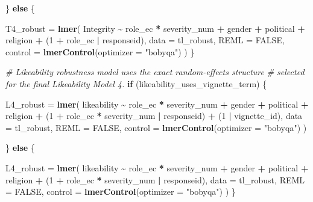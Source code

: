 \documentclass[
]{article}
\newenvironment{Shaded}{\begin{snugshade}}{\end{snugshade}}
\newcommand{\AttributeTok}[1]{\textcolor[rgb]{0.13,0.29,0.53}{#1}}
\newcommand{\CommentTok}[1]{\textcolor[rgb]{0.56,0.35,0.01}{\textit{#1}}}
\newcommand{\ConstantTok}[1]{\textcolor[rgb]{0.56,0.35,0.01}{#1}}
\newcommand{\ControlFlowTok}[1]{\textcolor[rgb]{0.13,0.29,0.53}{\textbf{#1}}}
\newcommand{\DecValTok}[1]{\textcolor[rgb]{0.00,0.00,0.81}{#1}}
\newcommand{\FunctionTok}[1]{\textcolor[rgb]{0.13,0.29,0.53}{\textbf{#1}}}
\newcommand{\NormalTok}[1]{#1}
\newcommand{\OtherTok}[1]{\textcolor[rgb]{0.56,0.35,0.01}{#1}}
\newcommand{\SpecialCharTok}[1]{\textcolor[rgb]{0.81,0.36,0.00}{\textbf{#1}}}
\newcommand{\StringTok}[1]{\textcolor[rgb]{0.31,0.60,0.02}{#1}}
\begin{document}
\begin{Shaded}
\begin{Highlighting}[]
\NormalTok{\} }\ControlFlowTok{else}\NormalTok{ \{}

\NormalTok{  T4\_robust }\OtherTok{=} \FunctionTok{lmer}\NormalTok{(}
\NormalTok{    Integrity }\SpecialCharTok{\textasciitilde{}}\NormalTok{ role\_ec }\SpecialCharTok{*}\NormalTok{ severity\_num }\SpecialCharTok{+}
\NormalTok{      gender }\SpecialCharTok{+}\NormalTok{ political }\SpecialCharTok{+}\NormalTok{ religion }\SpecialCharTok{+}
\NormalTok{      (}\DecValTok{1} \SpecialCharTok{+}\NormalTok{ role\_ec }\SpecialCharTok{|}\NormalTok{ responseid),}
    \AttributeTok{data =}\NormalTok{ tl\_robust,}
    \AttributeTok{REML =} \ConstantTok{FALSE}\NormalTok{,}
    \AttributeTok{control =} \FunctionTok{lmerControl}\NormalTok{(}\AttributeTok{optimizer =} \StringTok{"bobyqa"}\NormalTok{)}
\NormalTok{  )}
\NormalTok{\}}


\CommentTok{\# Likeability robustness model uses the exact random{-}effects structure}
\CommentTok{\# selected for the final Likeability Model 4.}
\ControlFlowTok{if}\NormalTok{ (likeability\_uses\_vignette\_term) \{}

\NormalTok{  L4\_robust }\OtherTok{=} \FunctionTok{lmer}\NormalTok{(}
\NormalTok{    likeability }\SpecialCharTok{\textasciitilde{}}\NormalTok{ role\_ec }\SpecialCharTok{*}\NormalTok{ severity\_num }\SpecialCharTok{+}
\NormalTok{      gender }\SpecialCharTok{+}\NormalTok{ political }\SpecialCharTok{+}\NormalTok{ religion }\SpecialCharTok{+}
\NormalTok{      (}\DecValTok{1} \SpecialCharTok{+}\NormalTok{ role\_ec }\SpecialCharTok{*}\NormalTok{ severity\_num }\SpecialCharTok{|}\NormalTok{ responseid) }\SpecialCharTok{+}
\NormalTok{      (}\DecValTok{1} \SpecialCharTok{|}\NormalTok{ vignette\_id),}
    \AttributeTok{data =}\NormalTok{ tl\_robust,}
    \AttributeTok{REML =} \ConstantTok{FALSE}\NormalTok{,}
    \AttributeTok{control =} \FunctionTok{lmerControl}\NormalTok{(}\AttributeTok{optimizer =} \StringTok{"bobyqa"}\NormalTok{)}
\NormalTok{  )}

\NormalTok{\} }\ControlFlowTok{else}\NormalTok{ \{}

\NormalTok{  L4\_robust }\OtherTok{=} \FunctionTok{lmer}\NormalTok{(}
\NormalTok{    likeability }\SpecialCharTok{\textasciitilde{}}\NormalTok{ role\_ec }\SpecialCharTok{*}\NormalTok{ severity\_num }\SpecialCharTok{+}
\NormalTok{      gender }\SpecialCharTok{+}\NormalTok{ political }\SpecialCharTok{+}\NormalTok{ religion }\SpecialCharTok{+}
\NormalTok{      (}\DecValTok{1} \SpecialCharTok{+}\NormalTok{ role\_ec }\SpecialCharTok{*}\NormalTok{ severity\_num }\SpecialCharTok{|}\NormalTok{ responseid),}
    \AttributeTok{data =}\NormalTok{ tl\_robust,}
    \AttributeTok{REML =} \ConstantTok{FALSE}\NormalTok{,}
    \AttributeTok{control =} \FunctionTok{lmerControl}\NormalTok{(}\AttributeTok{optimizer =} \StringTok{"bobyqa"}\NormalTok{)}
\NormalTok{  )}
\NormalTok{\}}
\end{Highlighting}
\end{Shaded}
\end{document}
